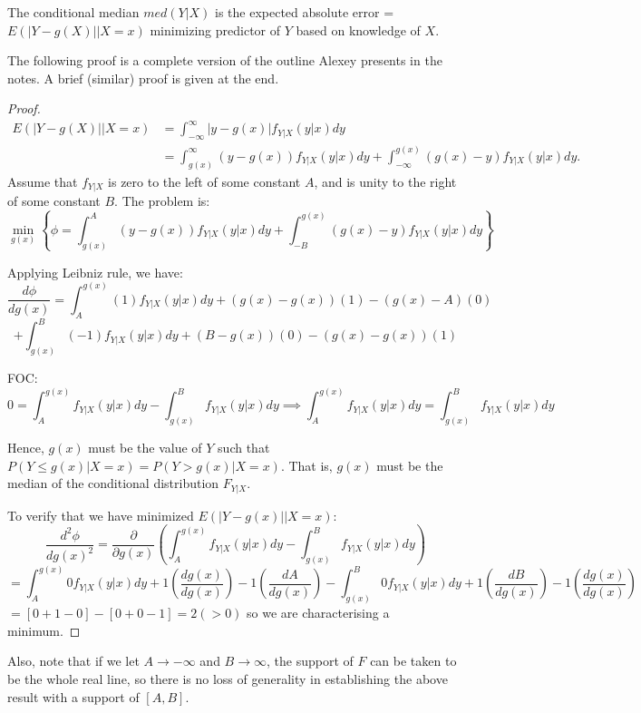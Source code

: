 \documentclass[DIV=14,titlepage=false]{scrreprt}
\begin{document}
\begin{theorem}
  The conditional median $med(Y|X)$ is the expected absolute error = $E(|Y - g(X)||X = x)$ minimizing predictor of $ Y $ based on knowledge of $ X $.
\end{theorem}
The following proof is a complete version of the outline Alexey presents in the notes. A brief (similar) proof is given at the end.\\
\begin{proof}
\begin{align*}
  E(|Y - g(X)||X = x) &= \int_{-\infty}^{\infty} |y - g(x)| f_{Y|X}(y|x) dy\\
  &= \int_{g(x)}^{\infty} (y - g(x)) f_{Y|X}(y|x) dy + \int_{-\infty}^{g(x)} (g(x) - y) f_{Y|X}(y|x) dy.
\end{align*}
Assume that \( f_{Y|X} \) is zero to the left of some constant \( A \), and is unity to the right of some constant \( B \). The problem is: 
\[ \min_{g(x)} \left\{ \phi = \int_{g(x)}^{A} (y - g(x)) f_{Y|X}(y|x) dy + \int_{-B}^{g(x)} (g(x) - y) f_{Y|X}(y|x) dy \right\} \]

Applying Leibniz rule, we have:
\[
\frac{d\phi}{dg(x)} = \int_{A}^{g(x)} (1) f_{Y|X}(y|x) dy + (g(x) - g(x))(1) - (g(x)-A)(0)\]
\[+ \int_{g(x)}^{B} (-1)f_{Y|X}(y|x) dy + (B-g(x))(0) - (g(x)-g(x))(1)
\]

FOC: 
\[
0 =  \int_{A}^{g(x)}f_{Y|X}(y|x) dy -\int_{g(x)}^{B}f_{Y|X}(y|x) dy \implies \int_{A}^{g(x)}f_{Y|X}(y|x) dy = \int_{g(x)}^{B}f_{Y|X}(y|x) dy
\]

Hence, \( g(x) \) must be the value of \( Y \) such that \( P(Y \leq g(x)|X = x) = P(Y > g(x)|X = x) \). That is, \( g(x) \) must be the median of the conditional distribution \( F_{Y|X} \).

To verify that we have minimized \( E(|Y - g(x)||X = x) \):
\[
\frac{d^2\phi}{dg(x)^2} = \frac{\partial}{\partial g(x)} \left( \int_{A}^{g(x)}f_{Y|X}(y|x) dy -\int_{g(x)}^{B}f_{Y|X}(y|x) dy \right)
\]
\[
= \int_{A}^{g(x)} 0f_{Y|X}(y|x) dy + 1\left(\frac{dg(x)}{dg(x)}\right) - 1\left(\frac{dA}{dg(x)}\right)  - \int_{g(x)}^{B} 0f_{Y|X}(y|x) dy + 1\left(\frac{dB}{dg(x)}\right) - 1\left(\frac{dg(x)}{dg(x)}\right)
\]
$=[0+1-0]-[0+0-1]=2(>0)$ so we are characterising a minimum.
\end{proof}
Also, note that if we let \( A \to -\infty \) and \( B \to \infty \), the support of \( F \) can be taken to be the whole real line, so there is no loss of generality in establishing the above result with a support of \( [A, B] \).\\
\end{document}
